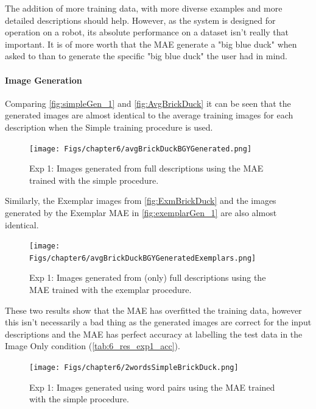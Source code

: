 The addition of more training data, with more diverse examples and more detailed descriptions should help. However, as the system is designed for operation on a robot, its absolute performance on a dataset isn't really that important. It is of more worth that the \ac{MAE} generate a "big blue duck" when asked to than to generate the specific "big blue duck" the user had in mind.

\paragraph{Image Generation}

Comparing \autoref{fig:simpleGen_1} and \autoref{fig:AvgBrickDuck} it can be seen that the generated images are almost identical to the average training images for each description when the Simple training procedure is used. 

\begin{figure}[ht]
    \centering
    \texttt{[image: Figs/chapter6/avgBrickDuckBGYGenerated.png]}
    \caption{Exp 1: Images generated from full descriptions using the \ac{MAE} trained with the simple procedure.}
    \label{fig:simpleGen_1}
\end{figure}

Similarly, the Exemplar images from \autoref{fig:ExmBrickDuck} and the images generated by the Exemplar \ac{MAE} in \autoref{fig:exemplarGen_1} are also almost identical.

\begin{figure}[ht]
    \centering
    \texttt{[image: Figs/chapter6/avgBrickDuckBGYGeneratedExemplars.png]}
    \caption{Exp 1: Images generated from (only) full descriptions using the MAE trained with the exemplar procedure.}
    \label{fig:exemplarGen_1}
\end{figure}

These two results show that the \ac{MAE} has overfitted the training data, however this isn't necessarily a bad thing as the generated images are correct for the input descriptions and the \ac{MAE} has perfect accuracy at labelling the test data in the Image Only condition (\autoref{tab:6_res_exp1_acc}).



\begin{figure}[ht]
    \centering
    \texttt{[image: Figs/chapter6/2wordsSimpleBrickDuck.png]}
    \caption{Exp 1: Images generated using word pairs using the MAE trained with the simple procedure.}
    \label{fig:2wordsSimpleBrickDuck}
\end{figure}

